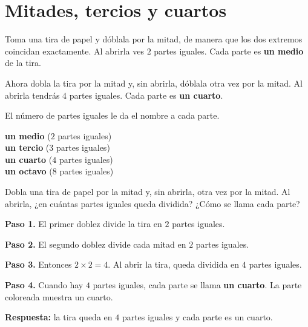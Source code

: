 \section{Mitades, tercios y cuartos}

Toma una tira de papel y dóblala por la mitad, de manera que los dos extremos coincidan exactamente. Al abrirla ves $2$ partes iguales. Cada parte es \textbf{un medio} de la tira.

Ahora dobla la tira por la mitad y, sin abrirla, dóblala otra vez por la mitad. Al abrirla tendrás $4$ partes iguales. Cada parte es \textbf{un cuarto}.

\begin{wbidea}
El número de partes iguales le da el nombre a cada parte.

\begin{center}
 \quad \textbf{un medio} ($2$ partes iguales)\\[1em]
 \quad \textbf{un tercio} ($3$ partes iguales)\\[1em]
 \quad \textbf{un cuarto} ($4$ partes iguales)\\[1em]
 \quad \textbf{un octavo} ($8$ partes iguales)
\end{center}
\end{wbidea}

\begin{wbexample}
Dobla una tira de papel por la mitad y, sin abrirla, otra vez por la mitad. Al abrirla, ¿en cuántas partes iguales queda dividida? ¿Cómo se llama cada parte?

\textbf{Paso 1.} El primer doblez divide la tira en $2$ partes iguales.

\textbf{Paso 2.} El segundo doblez divide cada mitad en $2$ partes iguales.

\textbf{Paso 3.} Entonces $2 \times 2 = 4$. Al abrir la tira, queda dividida en $4$ partes iguales.

\textbf{Paso 4.} Cuando hay $4$ partes iguales, cada parte se llama \textbf{un cuarto}. La parte coloreada muestra un cuarto.

\begin{center}
\end{center}

\textbf{Respuesta:} la tira queda en $4$ partes iguales y cada parte es un cuarto.
\end{wbexample}

